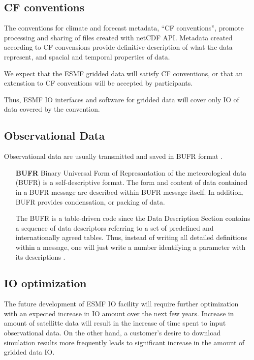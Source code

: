 \subsection{CF conventions} 

The conventions for climate and forecast metadata, ``CF conventions'',
\cite{NetCDF_CF_v1_beta3} promote processing and sharing of files
created with netCDF API. Metadata created according to CF convensions
provide definitive description of what the data represent, and spacial
and temporal properties of data.

We expect that the ESMF gridded data will satisfy CF conventions, or
that an extenstion to CF conventions will be accepted by participants.

Thus, ESMF IO interfaces and software for gridded data will cover only
IO of data covered by the convention.

\subsection{Observational Data}

Observational data are usually transmitted and saved in BUFR format 
\cite{WMO-BUFR-CREX}. 

\begin{itemize}
\item[\bf BUFR] Binary Universal Form of Represantation
of the meteorological data (BUFR) is a self-descriptive format. The
form and content of data contained in a BUFR message are described
within BUFR message itself. In addition, BUFR provides condensation,
or packing of data. 

The BUFR is a table-driven code since the Data Description Section
contains a sequence of data descriptors referring to a set of predefined and 
internationally agreed tables. Thus, instead of writing all detailed
definitions within a message, one will just write a number identifying
a parameter with its descriptions \cite{WMO-BUFR-CREX}.
\end{itemize}

\subsection{IO optimization}

The future development of ESMF IO facility will require further
optimization with an expected increase in IO amount over the next few
years. Increase in amount of satellitte data will result in the
increase of time spent to input observational data. On the other hand,
a customer's desire to download simulation results more frequently leads
to significant increase in the amount of gridded data IO.



